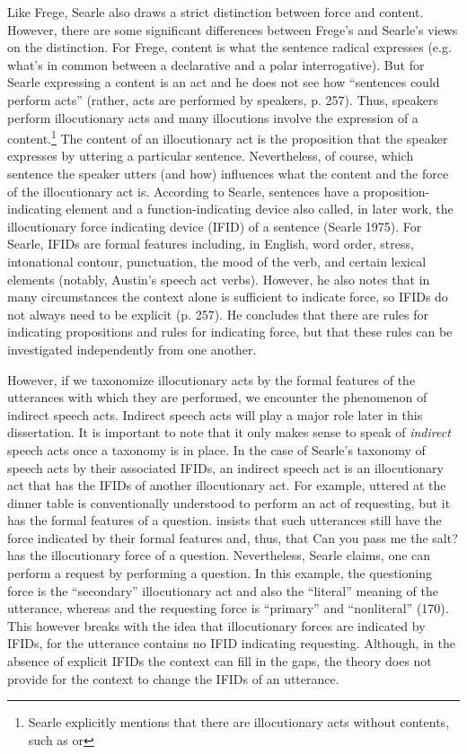 Like Frege, Searle also draws a strict distinction between force and content. However, there are some significant differences between Frege’s and Searle’s views on the distinction. For Frege, content is what the sentence radical expresses (e.g. what’s in common between a declarative and a polar interrogative). But for Searle expressing a content is an act and he does not see how “sentences could perform acts” (rather, acts are performed by speakers, p. 257). Thus, speakers perform illocutionary acts and many illocutions involve the expression of a content.\footnote{Searle explicitly mentions that there are illocutionary acts without contents, such as  or } The content of an illocutionary act is the proposition that the speaker expresses by uttering a particular sentence. Nevertheless, of course, which sentence the speaker utters (and how) influences what the content and the force of the illocutionary act is. According to Searle, sentences have a proposition-indicating element and a function-indicating device also called, in later work, the illocutionary force indicating device (IFID) of a sentence (Searle 1975). For Searle, IFIDs are formal features including, in English, word order, stress, intonational contour, punctuation, the mood of the verb, and certain lexical elements (notably, Austin’s speech act verbs). However, he also notes that in many circumstances the context alone is sufficient to indicate force, so IFIDs do not always need to be explicit (p. 257). He concludes that there are rules for indicating propositions and rules for indicating force, but that these rules can be investigated independently from one another. 

However, if we taxonomize illocutionary acts by the formal features of the utterances with which they are performed, we encounter the phenomenon of indirect speech acts. Indirect speech acts will play a major role later in this dissertation. It is important to note that it only makes sense to speak of \emph{indirect} speech acts once a taxonomy is in place. In the case of Searle’s taxonomy of speech acts by their associated IFIDs, an indirect speech act is an illocutionary act that has the IFIDs of another illocutionary act. For example,  uttered at the dinner table is conventionally understood to perform an act of requesting, but it has the formal features of a question. \textcite{searle1975indirect} insists that such utterances still have the force indicated by their formal features and, thus, that Can you pass me the salt? has the illocutionary force of a question. Nevertheless, Searle claims, one can perform a request by performing a question. In this example, the questioning force is the “secondary” illocutionary act and also the ``literal” meaning of the utterance, whereas and the requesting force is “primary” and “nonliteral” (170). This however breaks with the idea that illocutionary forces are indicated by IFIDs, for the utterance contains no IFID indicating requesting. Although, in the absence of explicit IFIDs the context can fill in the gaps, the theory does not provide for the context to change the IFIDs of an utterance. 

